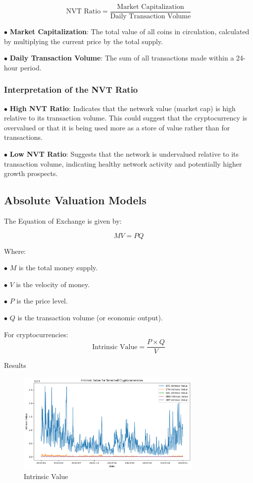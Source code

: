 \documentclass{ledger}
\begin{document}
\[
\text{NVT Ratio} = \frac{\text{Market Capitalization}}{\text{Daily Transaction Volume}}
\]

$ \bullet $ \textbf{Market Capitalization}: The total value of all coins in circulation, calculated by multiplying the current price by the total supply.

$ \bullet $  \textbf{Daily Transaction Volume}: The sum of all transactions made within a 24-hour period.

\hfill \break

\subsubsection{Interpretation of the NVT Ratio}

\hfill \break

$ \bullet $  \textbf{High NVT Ratio}: Indicates that the network value (market cap) is high relative to its transaction volume. This could suggest that the cryptocurrency is overvalued or that it is being used more as a store of value rather than for transactions.

$ \bullet $  \textbf{Low NVT Ratio}: Suggests that the network is undervalued relative to its transaction volume, indicating healthy network activity and potentially higher growth prospects.

\subsection{Absolute Valuation Models}

The Equation of Exchange is given by:

\[
MV = PQ
\]

Where:

$ \bullet $  $M$ is the total money supply.

$ \bullet $  $V$ is the velocity of money.

$ \bullet $ $P$ is the price level.

$ \bullet $ $Q$ is the transaction volume (or economic output).


For cryptocurrencies:
\[
\text{Intrinsic Value} = \frac{P \times Q}{V}
\]

Results

\begin{figure}
    \centering
    \includegraphics[width=0.8\textwidth]{./code/valuation-techniques/intrinsic_value.png}
    \caption{Intrinsic Value }
    \label{fig:beta}
\end{figure}
\end{document}
